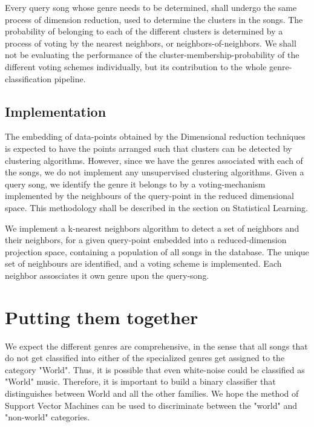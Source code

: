 \documentclass[12pt]{article}
\begin{document}
Every query song whose genre needs to be determined, shall undergo the same process of dimension reduction, used to determine the clusters in the songs. The probability of belonging to each of the different clusters is determined by a process of voting by the nearest neighbors, or neighbors-of-neighbors. We shall not be evaluating the performance of the cluster-membership-probability of the different voting schemes individually, but its contribution to the whole genre-classification pipeline. 

\subsection{Implementation}
The embedding of data-points obtained by the Dimensional reduction techniques is expected to have the points arranged such that clusters can be detected by clustering algorithms. However, since we have the genres associated with each of the songs, we do not implement any unsupervised clustering algorithms. Given a query song, we identify the genre it belongs to by a voting-mechanism implemented by the neighbours of the query-point in the reduced dimensional space. This methodology shall be described in the section on Statistical Learning. 

We implement a k-nearest neighbors algorithm to detect a set of neighbors and their neighbors, for a given query-point embedded into a reduced-dimension projection space, containing a population of all songs in the database. The unique set of neighbours are identified, and a voting scheme is implemented. Each neighbor assosciates it own genre upon the query-song. 

\section{Putting them together}

We expect the different genres are comprehensive, in the sense that all songs that do not get classified into either of the specialized genres get assigned to the category "World". Thus, it is possible that even white-noise could be classified as "World" music. Therefore, it is important to build a binary classifier that distinguishes between World and all the other families. We hope the method of Support Vector Machines can be used to discriminate between the "world" and "non-world" categories. 
\end{document}
